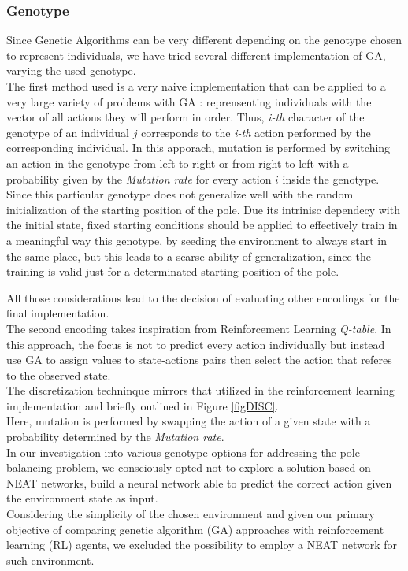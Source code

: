 \subsubsection{Genotype}
Since Genetic Algorithms can be very different depending on the genotype chosen to represent individuals, we have tried several different implementation of GA, varying the used genotype.
\\


The first method used is a very naive implementation that can be applied to a very large variety of problems with GA : reprensenting individuals with the vector of all actions they will perform in order.
Thus, \textit{i-th} character of the genotype of an individual $j$ corresponds to the \textit{i-th} action performed by the corresponding individual.
In this apporach, mutation is performed by switching an action in the genotype from left to right or from right to left with a probability given by the \textit{Mutation rate} for every action $i$ inside the genotype.
\\
Since this particular genotype does not generalize well with the random initialization of the starting position of the pole. Due its intrinisc dependecy with the initial state, fixed starting conditions should be applied to effectively train in a meaningful way this genotype, by seeding the environment to always start in the same place, but this leads to a scarse ability of generalization, since the training is valid just for a determinated starting position of the pole.

All those considerations lead to the decision of evaluating other encodings for the final implementation.\\

The second encoding takes inspiration from Reinforcement Learning \textit{Q-table}.
In this approach, the focus is not to predict every action individually  but instead use GA to assign values to state-actions pairs then select the action that referes to the observed state.\\
The discretization techninque mirrors that utilized in the reinforcement learning implementation and briefly outlined in Figure \ref{figDISC}.\\
Here, mutation is performed by swapping the action of a given state with a probability determined by the \textit{Mutation rate}.
\\
In our investigation into various genotype options for addressing the pole-balancing problem, we consciously opted not to explore a solution based on NEAT\cite{stanley2002NEAT} networks, build a neural network able to predict the correct action given the environment state as input.\\
Considering the simplicity of the chosen environment and given our primary objective of comparing genetic algorithm (GA) approaches with reinforcement learning (RL) agents, we excluded the possibility to employ a NEAT network for such environment.

